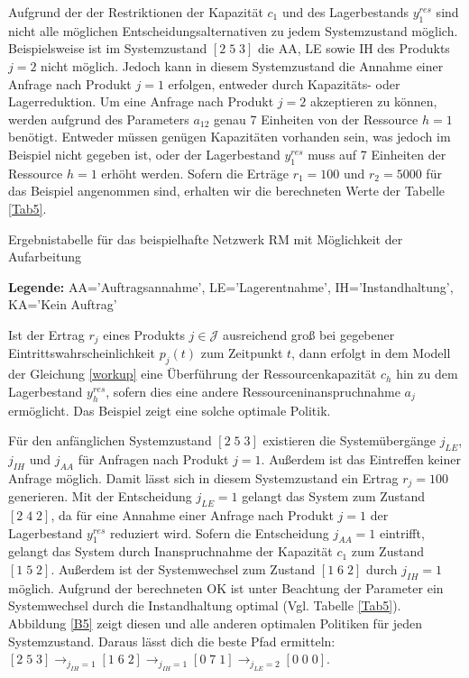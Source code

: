 Aufgrund der der Restriktionen der Kapazität $c_{1}$ und des Lagerbestands $y_{1}^{res}$ sind nicht alle möglichen Entscheidungsalternativen zu jedem Systemzustand möglich. Beispielsweise ist im Systemzustand $[2\;5\;3]$ die AA, LE sowie IH des Produkts $j=2$ nicht möglich. Jedoch kann in diesem Systemzustand die Annahme einer Anfrage nach Produkt $j=1$ erfolgen, entweder durch Kapazitäts- oder Lagerreduktion. Um eine Anfrage nach Produkt $j=2$ akzeptieren zu können, werden aufgrund des Parameters $a_{12}$ genau 7 Einheiten von der Ressource $h=1$ benötigt. Entweder müssen genügen Kapazitäten vorhanden sein, was jedoch im Beispiel nicht gegeben ist, oder der Lagerbestand $y_{1}^{res}$ muss auf 7 Einheiten der Ressource $h=1$ erhöht werden. Sofern die Erträge $r_{1}=100$ und $r_{2}=5000$ für das Beispiel angenommen sind, erhalten wir die berechneten Werte der Tabelle \ref{Tab5}.
\begin{table}
\begin{footnotesize}
    \caption{Ergebnistabelle für das beispielhafte Netzwerk RM mit Möglichkeit der Aufarbeitung} \label{Tab5}
    \vspace*{3mm}
        \begin{center}
      \end{center}
    \begin{center}
      {\footnotesize \textbf{Legende:} AA='Auftragsannahme', LE='Lagerentnahme', IH='Instandhaltung', KA='Kein Auftrag'} 
      \end{center}
\end{footnotesize}
\end{table}

Ist der Ertrag $r_{j}$ eines Produkts $j\in\mathcal{J}$ ausreichend groß bei gegebener Eintrittswahrscheinlichkeit $p_{j}(t)$ zum Zeitpunkt $t$, dann erfolgt in dem Modell der Gleichung \eqref{workup} eine Überführung der Ressourcenkapazität $c_{h}$ hin zu dem Lagerbestand $y_{h}^{res}$, sofern dies eine andere Ressourceninanspruchnahme $a_{j}$ ermöglicht. Das Beispiel zeigt eine solche optimale Politik.

Für den anfänglichen Systemzustand $[2\;5\;3]$ existieren die Systemübergänge $j_{LE}$, $j_{IH}$ und $j_{AA}$ für Anfragen nach Produkt $j=1$. Außerdem ist das Eintreffen keiner Anfrage möglich. Damit lässt sich in diesem Systemzustand ein Ertrag $r_{j}=100$ generieren. Mit der Entscheidung $j_{LE}=1$ gelangt das System zum Zustand $[2\;4\;2]$, da für eine Annahme einer Anfrage nach Produkt $j=1$ der Lagerbestand $y_{1}^{res}$ reduziert wird. Sofern die Entscheidung $j_{AA}=1$ eintrifft, gelangt das System durch Inanspruchnahme der Kapazität $c_{1}$ zum Zustand $[1\;5\;2]$. Außerdem ist der Systemwechsel zum Zustand $[1\;6\;2]$ durch $j_{IH}=1$ möglich. Aufgrund der berechneten OK ist unter Beachtung der Parameter ein Systemwechsel durch die Instandhaltung optimal (Vgl. Tabelle \ref{Tab5}). Abbildung \ref{B5} zeigt diesen und alle anderen optimalen Politiken für jeden Systemzustand. Daraus lässt dich die beste Pfad ermitteln:  $[2\;5\;3] \rightarrow_{j_{IH}=1} [1\;6\;2] \rightarrow_{j_{IH}=1} [0\;7\;1] \rightarrow_{j_{LE}=2} [0\;0\;0]$.


